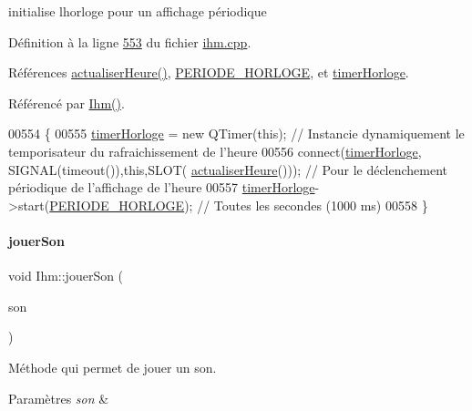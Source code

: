 initialise l\textquotesingle{}horloge pour un affichage périodique 



Définition à la ligne \hyperlink{ihm_8cpp_source_l00553}{553} du fichier \hyperlink{ihm_8cpp_source}{ihm.\+cpp}.



Références \hyperlink{ihm_8cpp_source_l00127}{actualiser\+Heure()}, \hyperlink{ihm_8h_source_l00026}{P\+E\+R\+I\+O\+D\+E\+\_\+\+H\+O\+R\+L\+O\+GE}, et \hyperlink{ihm_8h_source_l00053}{timer\+Horloge}.



Référencé par \hyperlink{ihm_8cpp_source_l00026}{Ihm()}.


\begin{DoxyCode}
00554 \{
00555     \hyperlink{class_ihm_a21ea35b212966fa2805241ea6237d351}{timerHorloge} = \textcolor{keyword}{new} QTimer(\textcolor{keyword}{this}); \textcolor{comment}{// Instancie dynamiquement le temporisateur du
       rafraichissement de l'heure}
00556     connect(\hyperlink{class_ihm_a21ea35b212966fa2805241ea6237d351}{timerHorloge}, SIGNAL(timeout()),\textcolor{keyword}{this},SLOT(
      \hyperlink{class_ihm_ad8b3b13e638ebbfbe8159d00d99ff88f}{actualiserHeure}())); \textcolor{comment}{// Pour le déclenchement périodique de l'affichage de l'heure}
00557     \hyperlink{class_ihm_a21ea35b212966fa2805241ea6237d351}{timerHorloge}->start(\hyperlink{ihm_8h_abe1de80d8a7149cf82da305f032d7b1e}{PERIODE\_HORLOGE});  \textcolor{comment}{// Toutes les secondes (1000 ms)}
00558 \}
\end{DoxyCode}
\mbox{\label{class_ihm_a55f2d106f7af9ed2e84f78822e23bb97}} 
\paragraph{\texorpdfstring{jouer\+Son}{jouerSon}}
{\footnotesize\ttfamily void Ihm\+::jouer\+Son (\begin{DoxyParamCaption}\item[{Q\+String}]{son }\end{DoxyParamCaption})\hspace{0.3cm}{\ttfamily [slot]}}



Méthode qui permet de jouer un son. 


\begin{DoxyParams}{Paramètres}
{\em son} & \\
\hline
\end{DoxyParams}



